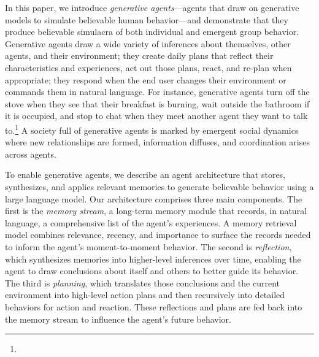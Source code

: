 In this paper, we introduce \textit{generative agents}---agents that draw on generative models to simulate believable human behavior---and demonstrate that they produce believable simulacra of both individual and emergent group behavior. Generative agents draw a wide variety of inferences about themselves, other agents, and their environment; they create daily plans that reflect their characteristics and experiences, act out those plans, react, and re-plan when appropriate; they respond when the end user changes their environment or commands them in natural language. For instance, generative agents turn off the stove when they see that their breakfast is burning, wait outside the bathroom if it is occupied, and stop to chat when they meet another agent they want to talk to.\footnote{} A society full of generative agents is marked by emergent social dynamics where new relationships are formed, information diffuses, and coordination arises across agents. 

To enable generative agents, we describe an agent architecture that stores, synthesizes, and applies relevant memories to generate believable behavior using a large language model. Our architecture comprises three main components. The first is the \textit{memory stream}, a long-term memory module that records, in natural language, a comprehensive list of the agent's experiences. A memory retrieval model combines relevance, recency, and importance to surface the records needed to inform the agent's moment-to-moment behavior. The second is \textit{reflection}, which synthesizes memories into higher-level inferences over time, enabling the agent to draw conclusions about itself and others to better guide its behavior. The third is \textit{planning}, which translates those conclusions and the current environment into high-level action plans and then recursively into detailed behaviors for action and reaction. These reflections and plans are fed back into the memory stream to influence the agent's future behavior.


